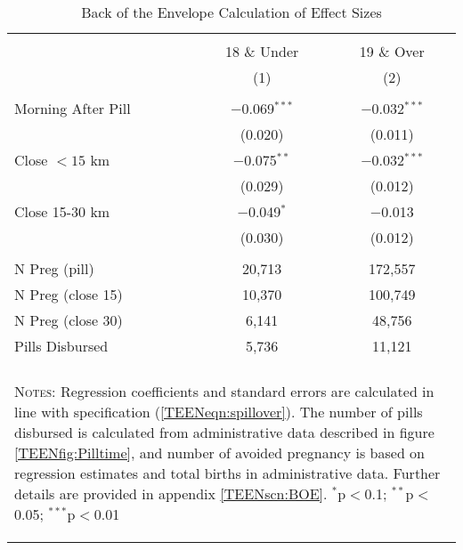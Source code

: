 \begin{table}[!htbp] \centering
\caption{Back of the Envelope Calculation of Effect Sizes}
\label{TEENtab:BOE}
\begin{tabular}{@{\extracolsep{5pt}}lcc}
\\[-1.8ex]\hline \hline \\[-1.8ex] 
& 18 \& Under & 19 \& Over\\ 
&(1)&(2) \\ \hline
 & &  \\
Morning After Pill &$-$0.069$^{***}$&$-$0.032$^{***}$\\
&(0.020)&(0.011)\\
Close $<15$ km &$-$0.075$^{**}$&$-$0.032$^{***}$\\
&(0.029)&(0.012)\\
Close 15-30 km &$-$0.049$^{*}$&$-$0.013\\
&(0.030)&(0.012)\\
& & \\ \midrule
N Preg (pill) &20,713&172,557\\
N Preg (close 15) &10,370&100,749\\
N Preg (close 30) &6,141&48,756\\
Pills Disbursed & 5,736 & 11,121 \\
\hline \hline \\[-1.8ex]
\multicolumn{3}{p{7.4cm}}{\begin{footnotesize}\textsc{Notes:}
Regression coefficients and standard errors are calculated in
line with specification (\ref{TEENeqn:spillover}). The number of
pills disbursed is calculated from administrative data described in 
figure \ref{TEENfig:Pilltime}, and number of avoided pregnancy is 
based on regression estimates and total births in administrative 
data. Further details are provided in appendix \ref{TEENscn:BOE}.
$^{*}$p$<$0.1; $^{**}$p$<$0.05; $^{***}$p$<$0.01\end{footnotesize}}
\normalsize\end{tabular}\end{table}
